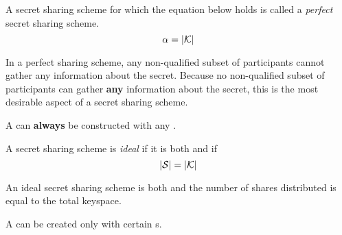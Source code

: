 \begin{definition}[Perfect]\label{def:Perfect_Secret_Sharing_Scheme}
  A secret sharing scheme for which the equation below holds is called a \emph{perfect} secret sharing scheme.
  \begin{equation}\label{eq:Perfect_Secret_Sharing_Scheme}
    \alpha = \lvert \operatorname{\mathcal{K}} \rvert
  \end{equation}

  In a perfect sharing scheme, any non-qualified subset of participants cannot gather any information about the secret.
  Because no non-qualified subset of participants can gather \textbf{any} information about the secret, this is the most desirable aspect of a secret sharing scheme.

  \begin{remark}\label{rmk:Ability_Construct_Perfect_Secret_Sharing_Scheme}
    A   can \textbf{always} be constructed with any .
  \end{remark}
\end{definition}

\begin{definition}[Ideal]\label{def:Ideal_Secret_Sharing_Scheme}
  A secret sharing scheme is \emph{ideal} if it is both  and if
  \begin{equation}\label{eq:Ideal_Secret_Sharing_Scheme}
    \lvert \operatorname{\mathcal{S}} \rvert = \lvert \operatorname{\mathcal{K}} \rvert
  \end{equation}

  An ideal secret sharing scheme is both  and the number of shares distributed is equal to the total keyspace.

  \begin{remark}\label{rmk:Ability_Construct_Ideal_Secret_Sharing_Scheme}
    A   can be created only with certain s.
  \end{remark}
\end{definition}

